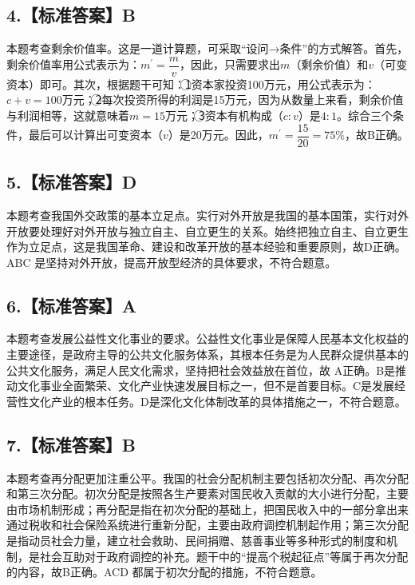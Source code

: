 \documentclass[UTF8,11pt]{ctexart}
\begin{document}
\subsection*{4.【标准答案】B}

本题考查剩余价值率。这是一道计算题，可采取“设问→条件”的方式解答。首先，剩余价值率用公式表示为：\(\displaystyle m^{\prime}=\dfrac{\displaystyle m}{\displaystyle v}\)，因此，只需要求出\(\displaystyle m\)（剩余价值）和\(\displaystyle v\)（可变资本）即可。其次，根据题干可知：\textcircled{1}资本家投资100万元，用公式表示为：\(\displaystyle c+v=100\)万元；\textcircled{2}每次投资所得的利润是15万元，因为从数量上来看，剩余价值与利润相等，这就意味着\(\displaystyle m=15\)万元；\textcircled{3}资本有机构成（\(\displaystyle c:v\)）是\(\displaystyle 4:1\)。综合三个条件，最后可以计算出可变资本（\(\displaystyle v\)）是20万元。因此，\(\displaystyle m^{\prime}=\dfrac{\displaystyle 15}{\displaystyle 20}=75\%\)，故B正确。


\subsection*{5.【标准答案】D}

本题考查我国外交政策的基本立足点。实行对外开放是我国的基本国策，实行对外开放要处理好对外开放与独立自主、自立更生的关系。始终把独立自主、自立更生作为立足点，这是我国革命、建设和改革开放的基本经验和重要原则，故D正确。ABC 是坚持对外开放，提高开放型经济的具体要求，不符合题意。


\subsection*{6.【标准答案】A}

本题考查发展公益性文化事业的要求。公益性文化事业是保障人民基本文化权益的主要途径，是政府主导的公共文化服务体系，其根本任务是为人民群众提供基本的公共文化服务，满足人民文化需求，坚持把社会效益放在首位，故 A正确。B是推动文化事业全面繁荣、文化产业快速发展目标之一，但不是首要目标。C是发展经营性文化产业的根本任务。D是深化文化体制改革的具体措施之一，不符合题意。


\subsection*{7.【标准答案】B}

本题考查再分配更加注重公平。我国的社会分配机制主要包括初次分配、再次分配和第三次分配。初次分配是按照各生产要素对国民收入贡献的大小进行分配，主要由市场机制形成；再分配是指在初次分配的基础上，把国民收入中的一部分拿出来通过税收和社会保险系统进行重新分配，主要由政府调控机制起作用；第三次分配是指动员社会力量，建立社会救助、民间捐赠、慈善事业等多种形式的制度和机制，是社会互助对于政府调控的补充。题干中的“提高个税起征点”等属于再次分配的内容，故B正确。ACD 都属于初次分配的措施，不符合题意。
\end{document}
